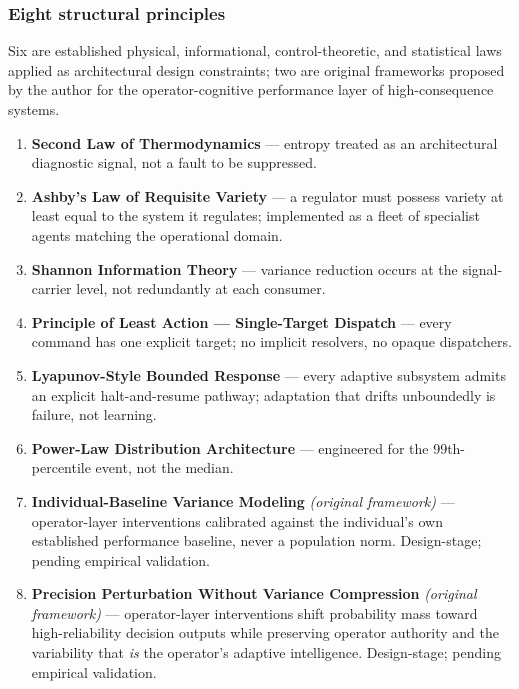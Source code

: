 \subsubsection{Eight structural
principles}\label{eight-structural-principles}

Six are established physical, informational, control-theoretic, and
statistical laws applied as architectural design constraints; two are
original frameworks proposed by the author for the operator-cognitive
performance layer of high-consequence systems.

\begin{enumerate}
\def\labelenumi{\arabic{enumi}.}
\tightlist
\item
  \textbf{Second Law of Thermodynamics} --- entropy treated as an
  architectural diagnostic signal, not a fault to be suppressed.
\item
  \textbf{Ashby's Law of Requisite Variety} --- a regulator must possess
  variety at least equal to the system it regulates; implemented as a
  fleet of specialist agents matching the operational domain.
\item
  \textbf{Shannon Information Theory} --- variance reduction occurs at
  the signal-carrier level, not redundantly at each consumer.
\item
  \textbf{Principle of Least Action --- Single-Target Dispatch} ---
  every command has one explicit target; no implicit resolvers, no
  opaque dispatchers.
\item
  \textbf{Lyapunov-Style Bounded Response} --- every adaptive subsystem
  admits an explicit halt-and-resume pathway; adaptation that drifts
  unboundedly is failure, not learning.
\item
  \textbf{Power-Law Distribution Architecture} --- engineered for the
  99th-percentile event, not the median.
\item
  \textbf{Individual-Baseline Variance Modeling} \emph{(original
  framework)} --- operator-layer interventions calibrated against the
  individual's own established performance baseline, never a population
  norm. Design-stage; pending empirical validation.
\item
  \textbf{Precision Perturbation Without Variance Compression}
  \emph{(original framework)} --- operator-layer interventions shift
  probability mass toward high-reliability decision outputs while
  preserving operator authority and the variability that \emph{is} the
  operator's adaptive intelligence. Design-stage; pending empirical
  validation.
\end{enumerate}

